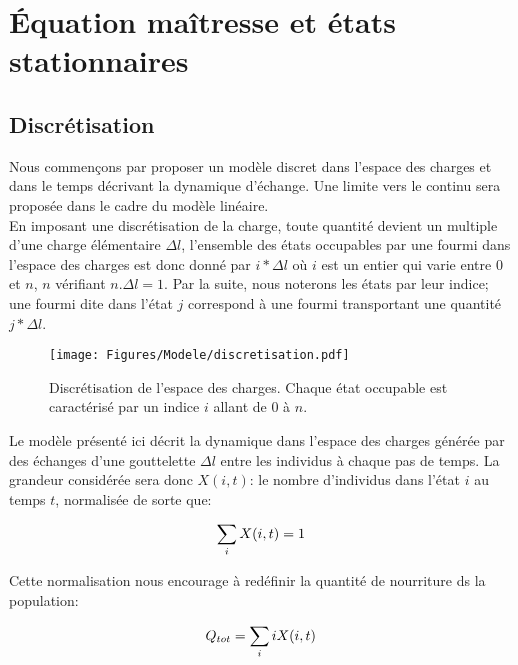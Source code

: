 \chapter{Équation maîtresse et états stationnaires}



\section{Discrétisation}

Nous commençons par proposer un modèle discret dans l'espace des charges et dans le temps décrivant la dynamique d'échange. Une limite vers le continu sera proposée dans le cadre du modèle linéaire.\\

En imposant une discrétisation de la charge, toute quantité devient un multiple d'une charge élémentaire $\Delta l$, l'ensemble des états occupables par une fourmi dans l'espace des charges est donc donné par $i*\Delta l$ où $i$ est un entier qui varie entre $0$ et $n$, $n$ vérifiant $n.\Delta l = 1$. Par la suite, nous noterons les états par leur indice; une fourmi dite dans l'état $j$ correspond à une fourmi transportant une quantité $j* \Delta l$.\\

\begin{figure}[h]
\centering
\texttt{[image: Figures/Modele/discretisation.pdf]}
\caption{Discrétisation de l'espace des charges. Chaque état occupable est caractérisé par un indice $i$ allant de $0$ à $n$.}
\label{discretisation}
\end{figure}


Le modèle présenté ici décrit la dynamique dans l'espace des charges générée par des échanges d'une gouttelette $\Delta l$ entre les individus à chaque pas de temps. La grandeur considérée sera donc $X(i,t)$: le nombre d'individus dans l'état $i$ au temps $t$, normalisée de sorte que:

\begin{equation}
\sum_i X(i,t)=1\\
\end{equation}

Cette normalisation nous encourage à redéfinir la quantité de nourriture ds la population:

\begin{equation}
Q_{tot}= \sum_i i X(i,t)\\
\end{equation}

